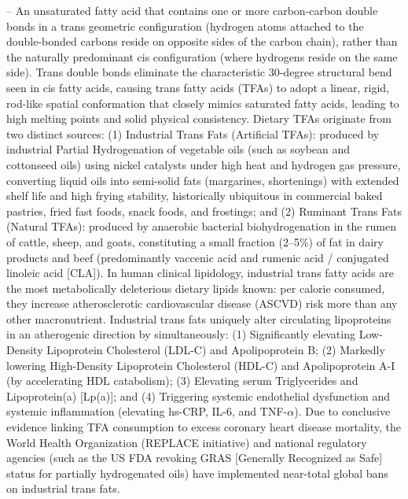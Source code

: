 -- An unsaturated fatty acid that contains one or more carbon-carbon double bonds in a trans geometric configuration (hydrogen atoms attached to the double-bonded carbons reside on opposite sides of the carbon chain), rather than the naturally predominant cis configuration (where hydrogens reside on the same side). Trans double bonds eliminate the characteristic 30-degree structural bend seen in cis fatty acids, causing trans fatty acids (TFAs) to adopt a linear, rigid, rod-like spatial conformation that closely mimics saturated fatty acids, leading to high melting points and solid physical consistency. Dietary TFAs originate from two distinct sources: (1) Industrial Trans Fats (Artificial TFAs): produced by industrial Partial Hydrogenation of vegetable oils (such as soybean and cottonseed oils) using nickel catalysts under high heat and hydrogen gas pressure, converting liquid oils into semi-solid fats (margarines, shortenings) with extended shelf life and high frying stability, historically ubiquitous in commercial baked pastries, fried fast foods, snack foods, and frostings; and (2) Ruminant Trans Fats (Natural TFAs): produced by anaerobic bacterial biohydrogenation in the rumen of cattle, sheep, and goats, constituting a small fraction (2--5\%) of fat in dairy products and beef (predominantly vaccenic acid and rumenic acid / conjugated linoleic acid [CLA]). In human clinical lipidology, industrial trans fatty acids are the most metabolically deleterious dietary lipids known: per calorie consumed, they increase atherosclerotic cardiovascular disease (ASCVD) risk more than any other macronutrient. Industrial trans fats uniquely alter circulating lipoproteins in an atherogenic direction by simultaneously: (1) Significantly elevating Low-Density Lipoprotein Cholesterol (LDL-C) and Apolipoprotein B; (2) Markedly lowering High-Density Lipoprotein Cholesterol (HDL-C) and Apolipoprotein A-I (by accelerating HDL catabolism); (3) Elevating serum Triglycerides and Lipoprotein(a) [Lp(a)]; and (4) Triggering systemic endothelial dysfunction and systemic inflammation (elevating hs-CRP, IL-6, and TNF-$\alpha$). Due to conclusive evidence linking TFA consumption to excess coronary heart disease mortality, the World Health Organization (REPLACE initiative) and national regulatory agencies (such as the US FDA revoking GRAS [Generally Recognized as Safe] status for partially hydrogenated oils) have implemented near-total global bans on industrial trans fats.

